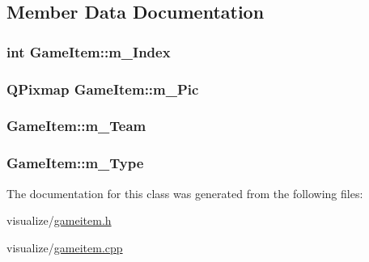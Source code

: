 \subsection{Member Data Documentation}
\hypertarget{class_game_item_a7fbc373a40381451ce97b8ca485a7e1c}{
\subsubsection[{m\_\-Index}]{\setlength{\rightskip}{0pt plus 5cm}int {\bf GameItem::m\_\-Index}}}
\label{class_game_item_a7fbc373a40381451ce97b8ca485a7e1c}
\hypertarget{class_game_item_a05d69a5d9238ae99b66935960071c79a}{
\subsubsection[{m\_\-Pic}]{\setlength{\rightskip}{0pt plus 5cm}QPixmap {\bf GameItem::m\_\-Pic}}}
\label{class_game_item_a05d69a5d9238ae99b66935960071c79a}
\hypertarget{class_game_item_a874e91b85de1de343cf641b6c7ac9bc3}{
\subsubsection[{m\_\-Team}]{ {\bf GameItem::m\_\-Team}}}
\label{class_game_item_a874e91b85de1de343cf641b6c7ac9bc3}
\hypertarget{class_game_item_a8c4bb763f9d85c07e2e27a06f0b68c16}{
\subsubsection[{m\_\-Type}]{ {\bf GameItem::m\_\-Type}}}
\label{class_game_item_a8c4bb763f9d85c07e2e27a06f0b68c16}


The documentation for this class was generated from the following files:\begin{DoxyCompactItemize}
\item 
visualize/\hyperlink{gameitem_8h}{gameitem.h}\item 
visualize/\hyperlink{gameitem_8cpp}{gameitem.cpp}\end{DoxyCompactItemize}
